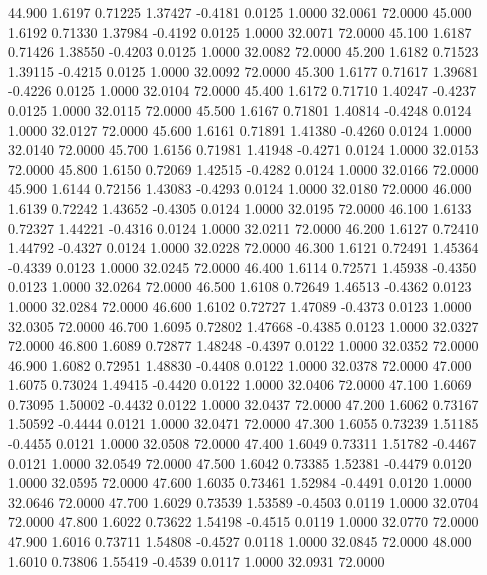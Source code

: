   44.900   1.6197   0.71225   1.37427  -0.4181   0.0125   1.0000  32.0061  72.0000
  45.000   1.6192   0.71330   1.37984  -0.4192   0.0125   1.0000  32.0071  72.0000
  45.100   1.6187   0.71426   1.38550  -0.4203   0.0125   1.0000  32.0082  72.0000
  45.200   1.6182   0.71523   1.39115  -0.4215   0.0125   1.0000  32.0092  72.0000
  45.300   1.6177   0.71617   1.39681  -0.4226   0.0125   1.0000  32.0104  72.0000
  45.400   1.6172   0.71710   1.40247  -0.4237   0.0125   1.0000  32.0115  72.0000
  45.500   1.6167   0.71801   1.40814  -0.4248   0.0124   1.0000  32.0127  72.0000
  45.600   1.6161   0.71891   1.41380  -0.4260   0.0124   1.0000  32.0140  72.0000
  45.700   1.6156   0.71981   1.41948  -0.4271   0.0124   1.0000  32.0153  72.0000
  45.800   1.6150   0.72069   1.42515  -0.4282   0.0124   1.0000  32.0166  72.0000
  45.900   1.6144   0.72156   1.43083  -0.4293   0.0124   1.0000  32.0180  72.0000
  46.000   1.6139   0.72242   1.43652  -0.4305   0.0124   1.0000  32.0195  72.0000
  46.100   1.6133   0.72327   1.44221  -0.4316   0.0124   1.0000  32.0211  72.0000
  46.200   1.6127   0.72410   1.44792  -0.4327   0.0124   1.0000  32.0228  72.0000
  46.300   1.6121   0.72491   1.45364  -0.4339   0.0123   1.0000  32.0245  72.0000
  46.400   1.6114   0.72571   1.45938  -0.4350   0.0123   1.0000  32.0264  72.0000
  46.500   1.6108   0.72649   1.46513  -0.4362   0.0123   1.0000  32.0284  72.0000
  46.600   1.6102   0.72727   1.47089  -0.4373   0.0123   1.0000  32.0305  72.0000
  46.700   1.6095   0.72802   1.47668  -0.4385   0.0123   1.0000  32.0327  72.0000
  46.800   1.6089   0.72877   1.48248  -0.4397   0.0122   1.0000  32.0352  72.0000
  46.900   1.6082   0.72951   1.48830  -0.4408   0.0122   1.0000  32.0378  72.0000
  47.000   1.6075   0.73024   1.49415  -0.4420   0.0122   1.0000  32.0406  72.0000
  47.100   1.6069   0.73095   1.50002  -0.4432   0.0122   1.0000  32.0437  72.0000
  47.200   1.6062   0.73167   1.50592  -0.4444   0.0121   1.0000  32.0471  72.0000
  47.300   1.6055   0.73239   1.51185  -0.4455   0.0121   1.0000  32.0508  72.0000
  47.400   1.6049   0.73311   1.51782  -0.4467   0.0121   1.0000  32.0549  72.0000
  47.500   1.6042   0.73385   1.52381  -0.4479   0.0120   1.0000  32.0595  72.0000
  47.600   1.6035   0.73461   1.52984  -0.4491   0.0120   1.0000  32.0646  72.0000
  47.700   1.6029   0.73539   1.53589  -0.4503   0.0119   1.0000  32.0704  72.0000
  47.800   1.6022   0.73622   1.54198  -0.4515   0.0119   1.0000  32.0770  72.0000
  47.900   1.6016   0.73711   1.54808  -0.4527   0.0118   1.0000  32.0845  72.0000
  48.000   1.6010   0.73806   1.55419  -0.4539   0.0117   1.0000  32.0931  72.0000
